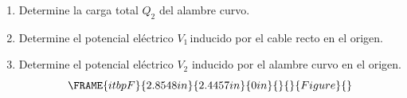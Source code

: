 \documentclass[onecolumn]{article}
\begin{document}
\begin{enumerate}
\begin{enumerate}
\item Determine la carga total $Q_{2}$ del alambre curvo.

\item Determine el potencial el\'{e}ctrico $V_{1}\,$inducido por el cable
recto en el origen.

\item Determine el potencial el\'{e}ctrico $V_{2}$ inducido por el alambre
curvo en el origen. 
\begin{equation*}
\FRAME{itbpF}{2.8548in}{2.4457in}{0in}{}{}{Figure}{\special{language
"Scientific Word";type "GRAPHIC";maintain-aspect-ratio TRUE;display
"USEDEF";valid_file "T";width 2.8548in;height 2.4457in;depth
0in;original-width 6.1834in;original-height 5.2926in;cropleft "0";croptop
"1";cropright "1";cropbottom "0";tempfilename
'TLDD8I04.bmp';tempfile-properties "XPR";}}
\end{equation*}
\end{enumerate}
\end{enumerate}
\end{document}

